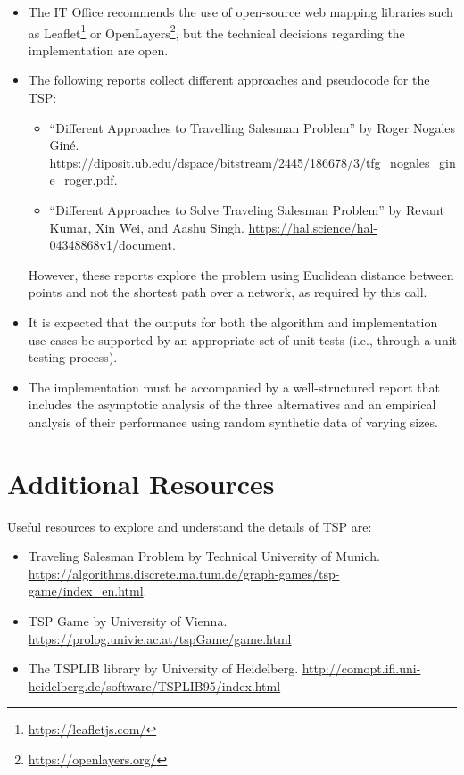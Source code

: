\documentclass[11pt]{article}
\begin{document}
\begin{itemize}
    \item The IT Office recommends the use of open-source web mapping libraries such as Leaflet\footnote{\url{https://leafletjs.com/}} or OpenLayers\footnote{\url{https://openlayers.org/}}, but the technical decisions regarding the implementation are open.
    \item The following reports collect different approaches and pseudocode for the TSP:
        \begin{itemize}
            \item ``Different Approaches to Travelling Salesman Problem'' by Roger Nogales Giné. \url{https://diposit.ub.edu/dspace/bitstream/2445/186678/3/tfg_nogales_gine_roger.pdf}.
            \item ``Different Approaches to Solve Traveling Salesman Problem'' by Revant Kumar, Xin Wei, and Aashu Singh. \url{https://hal.science/hal-04348868v1/document}.
        \end{itemize}
    However, these reports explore the problem using Euclidean distance between points and not the shortest path over a network, as required by this call.
    \item It is expected that the outputs for both the algorithm and implementation use cases be supported by an appropriate set of unit tests (i.e., through a unit testing process).
    \item The implementation must be accompanied by a well-structured report that includes the asymptotic analysis of the three alternatives and an empirical analysis of their performance using random synthetic data of varying sizes.
\end{itemize}

\section{Additional Resources}

Useful resources to explore and understand the details of TSP are:
    \begin{itemize}
        \item Traveling Salesman Problem by Technical University of Munich. \url{https://algorithms.discrete.ma.tum.de/graph-games/tsp-game/index_en.html}.
        \item TSP Game by University of Vienna. \url{https://prolog.univie.ac.at/tspGame/game.html}
        \item The TSPLIB library by University of Heidelberg. \url{http://comopt.ifi.uni-heidelberg.de/software/TSPLIB95/index.html}
    \end{itemize}
\end{document}
